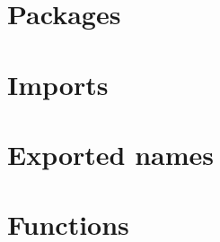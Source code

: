 \section{Packages}





\section{Imports}


\newpage



\section{Exported names}





\section{Functions}





